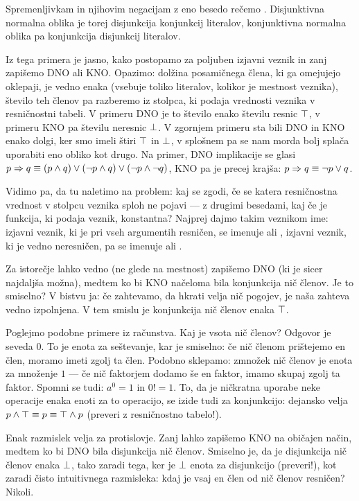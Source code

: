                 Spremenljivkam in njihovim negacijam z eno besedo rečemo . Disjunktivna normalna oblika je torej disjunkcija konjunkcij literalov, konjunktivna normalna oblika pa konjunkcija disjunkcij literalov.

                Iz tega primera je jasno, kako postopamo za poljuben izjavni veznik in zanj zapišemo DNO ali KNO. Opazimo: dolžina posamičnega člena, ki ga omejujejo oklepaji, je vedno enaka (vsebuje toliko literalov, kolikor je mestnost veznika), število teh členov pa razberemo iz stolpca, ki podaja vrednosti veznika v resničnostni tabeli. V primeru DNO je to število enako številu resnic $\top$, v primeru KNO pa številu neresnic $\bot$. V zgornjem primeru sta bili DNO in KNO enako dolgi, ker smo imeli štiri $\top$ in $\bot$, v splošnem pa se nam morda bolj splača uporabiti eno obliko kot drugo. Na primer, DNO implikacije se glasi $p \Rightarrow q \equiv (p \land q) \lor (\lnot{p} \land q) \lor (\lnot{p} \land \lnot{q})$, KNO pa je precej krajša: $p \Rightarrow q \equiv \lnot{p} \lor q$.

                Vidimo pa, da tu naletimo na problem: kaj se zgodi, če se katera resničnostna vrednost v stolpcu veznika sploh ne pojavi --- z drugimi besedami, kaj če je funkcija, ki podaja veznik, konstantna? Najprej dajmo takim veznikom ime: izjavni veznik, ki je pri vseh argumentih resničen, se imenuje  ali , izjavni veznik, ki je vedno neresničen, pa se imenuje  ali .

                Za istorečje lahko vedno (ne glede na mestnost) zapišemo DNO (ki je sicer najdaljša možna), medtem ko bi KNO načeloma bila konjunkcija nič členov. Je to smiselno? V bistvu ja: če zahtevamo, da hkrati velja nič pogojev, je naša zahteva vedno izpolnjena. V tem smislu je konjunkcija nič členov enaka $\top$.

                Poglejmo podobne primere iz računstva. Kaj je vsota nič členov? Odgovor je seveda $0$. To je enota za seštevanje, kar je smiselno: če nič členom prištejemo en člen, moramo imeti zgolj ta člen. Podobno sklepamo: zmnožek nič členov je enota za množenje $1$ --- če nič faktorjem dodamo še en faktor, imamo skupaj zgolj ta faktor. Spomni se tudi: $a^0 = 1$ in $0! = 1$. To, da je ničkratna uporabe neke operacije enaka enoti za to operacijo, se izide tudi za konjunkcijo: dejansko velja $p \land \top \equiv p \equiv \top \land p$ (preveri z resničnostno tabelo!).

                Enak razmislek velja za protislovje. Zanj lahko zapišemo KNO na običajen način, medtem ko bi DNO bila disjunkcija nič členov. Smiselno je, da je disjunkcija nič členov enaka $\bot$, tako zaradi tega, ker je $\bot$ enota za disjunkcijo (preveri!), kot zaradi čisto intuitivnega razmisleka: kdaj je vsaj en člen od nič členov resničen? Nikoli.

